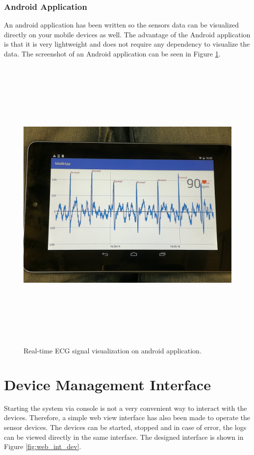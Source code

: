 \subsubsection{Android Application}
An android application has been written so the sensors data can be visualized directly on your mobile devices as well. The advantage of the Android application is that it is very lightweight and does not require any dependency to visualize the data. The screenshot of an Android application can be seen in Figure \ref{fig:ecg_and}.

\begin{figure}[htpb]
	\centering
	\includegraphics[width=16cm,height=15cm,keepaspectratio=true]{images/ecg_and}
	\caption{
		Real-time ECG signal visualization on android application.
	}
	\label{fig:ecg_and}
\end{figure}



\section{Device Management Interface}
Starting the system via console is not a very convenient way to interact with the devices. Therefore, a simple web view interface has also been made to operate the sensor devices. The devices can be started, stopped and in case of error, the logs can be viewed directly in the same interface. The designed interface is shown in Figure \ref{fig:web_int_dev}.


